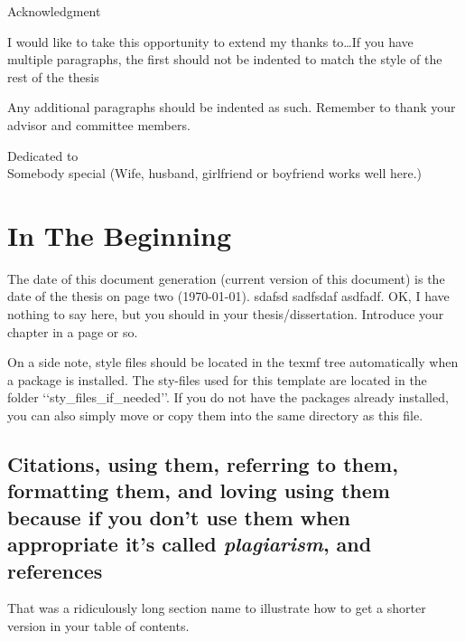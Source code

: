 \documentclass[12pt]{report}
\begin{document}
\begin{singlespace}
\tableofcontents
\listoffigures
\listoftables
\end{singlespace}
%
\newpage
\thispagestyle{plain}
\setlength{\parindent}{0em}
\begin{center}
{\huge Acknowledgment}
\end{center}

I would like to take this opportunity to extend my thanks to\ldots If you have multiple paragraphs, the first should not be indented to match the style of the rest of the thesis

\setlength{\parindent}{2em}
Any additional paragraphs should be indented as such.  Remember to thank your advisor and committee members.
%
\newpage
\thispagestyle{plain}
\vspace*{3in}
\begin{center}
Dedicated to\\
Somebody special (Wife, husband, girlfriend or boyfriend works well
here.)
\end{center}
%
%
%
\newpage
\setcounter{page}{1}
\setlength{\parindent}{2em}
\chapter{In The Beginning}
The date of this document generation (current version of this document) is the date of the thesis on page two (\today).{}
sdafsd sadfsdaf asdfadf. OK, I have nothing to say here, but you should in your thesis/dissertation. Introduce your chapter in a page or so.

On a side note, style files should be located in the texmf tree automatically when a package is installed.  The sty-files used for this template are located in the folder \lq\lq{}sty\_files\_if\_needed\rq\rq{}.  If you do not have the packages already installed, you can also simply move or copy them into the same directory as this file.

\section[Citations/References (short form of section name)]{Citations, using them, referring to them, formatting them, and loving using them because if you don't use them when appropriate it's called \emph{plagiarism}, and references}
That was a ridiculously long section name to illustrate how to get a shorter version in your table of contents.
\end{document}

